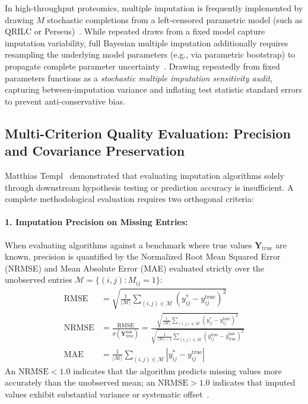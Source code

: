 \documentclass[11pt,oneside]{book}
\begin{document}
In high-throughput proteomics, multiple imputation is frequently implemented by drawing $M$ stochastic completions from a left-censored parametric model (such as QRILC or Perseus)~\cite{palstrom2020imputation}. While repeated draws from a fixed model capture imputation variability, full Bayesian multiple imputation additionally requires resampling the underlying model parameters (e.g., via parametric bootstrap) to propagate complete parameter uncertainty~\cite{rubin1987multiple, vanbuuren2018}. Drawing repeatedly from fixed parameters functions as a \textit{stochastic multiple imputation sensitivity audit}, capturing between-imputation variance and inflating test statistic standard errors to prevent anti-conservative bias.

\subsection{Multi-Criterion Quality Evaluation: Precision and Covariance Preservation}

Matthias Templ~\cite{templ2023visualization} demonstrated that evaluating imputation algorithms solely through downstream hypothesis testing or prediction accuracy is insufficient. A complete methodological evaluation requires two orthogonal criteria:

\paragraph{1. Imputation Precision on Missing Entries:}
When evaluating algorithms against a benchmark where true values $\mathbf{Y}_{\text{true}}$ are known, precision is quantified by the Normalized Root Mean Squared Error (NRMSE) and Mean Absolute Error (MAE) evaluated strictly over the unobserved entries $\mathcal{M} = \{(i,j) : M_{ij} = 1\}$:
\begin{align}
\text{RMSE} &= \sqrt{\frac{1}{|\mathcal{M}|} \sum_{(i,j) \in \mathcal{M}} \left( y_{ij}^* - y_{ij}^{\text{true}} \right)^2} \\
\text{NRMSE} &= \frac{\text{RMSE}}{\sigma(\mathbf{Y}_{\text{true}}^{\text{mis}})} = \frac{\sqrt{\frac{1}{|\mathcal{M}|} \sum_{(i,j) \in \mathcal{M}} \left( y_{ij}^* - y_{ij}^{\text{true}} \right)^2}}{\sqrt{\frac{1}{|\mathcal{M}|-1} \sum_{(i,j) \in \mathcal{M}} \left( y_{ij}^{\text{true}} - \bar{y}_{\text{true}}^{\text{mis}} \right)^2}} \\
\text{MAE} &= \frac{1}{|\mathcal{M}|} \sum_{(i,j) \in \mathcal{M}} \left| y_{ij}^* - y_{ij}^{\text{true}} \right|
\end{align}
An $\text{NRMSE} < 1.0$ indicates that the algorithm predicts missing values more accurately than the unobserved mean; an $\text{NRMSE} > 1.0$ indicates that imputed values exhibit substantial variance or systematic offset~\cite{templ2023visualization}.
\end{document}
